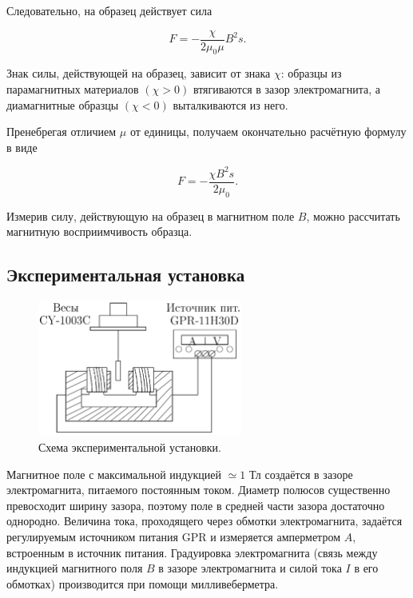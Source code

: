 \documentclass[a4paper,12pt]{article} %
\begin{document}
Следовательно, на образец действует сила

\begin{equation}\label{4}
F = -\frac{\chi}{2\mu_0\mu}B^2s.
\end{equation}

Знак силы, действующей на образец, зависит от знака $ \chi $: образцы из парамагнитных материалов $( \chi > 0)$ втягиваются в зазор электромагнита, а диамагнитные образцы $ (\chi < 0) $ выталкиваются из него.

Пренебрегая отличием $ \mu $ от единицы, получаем окончательно расчётную формулу в виде

\begin{equation}\label{5}
F = -\frac{\chi B^2s}{2\mu_0}.
\end{equation}

Измерив силу, действующую на образец в магнитном поле $ B $, можно рассчитать магнитную восприимчивость образца.

\subsection{Экспериментальная установка}

\begin{figure}[h]
    \centering
    \includegraphics[width=0.6\textwidth]{1.png}
    \caption{Схема экспериментальной установки.}
    \label{pic:1}
\end{figure}

Магнитное поле с максимальной индукцией $ \simeq 1 $ Тл создаётся в зазоре электромагнита, питаемого постоянным током. Диаметр полюсов существенно превосходит ширину зазора, поэтому поле в средней части зазора достаточно однородно. Величина тока, проходящего через обмотки электромагнита, задаётся регулируемым источником питания GPR и измеряется амперметром $A$, встроенным в источник питания. Градуировка электромагнита (связь между индукцией магнитного поля $B$ в зазоре электромагнита и силой тока $ I $ в его обмотках) производится при помощи милливеберметра.
\end{document}
